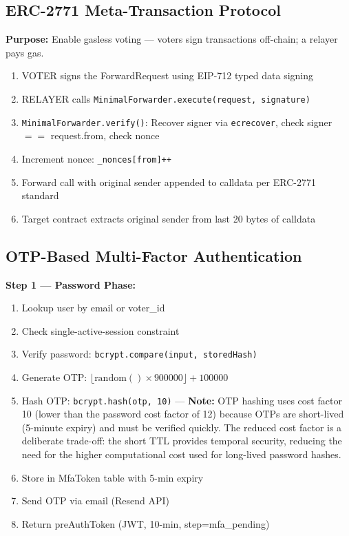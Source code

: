 \documentclass[oneside,a4paper,12pt]{book}
\begin{document}
\subsection{ERC-2771 Meta-Transaction Protocol}
\textbf{Purpose:} Enable gasless voting --- voters sign transactions off-chain; a relayer pays gas.
\begin{enumerate}[leftmargin=1.5cm]
    \item VOTER signs the ForwardRequest using EIP-712 typed data signing
    \item RELAYER calls \texttt{MinimalForwarder.execute(request, signature)}
    \item \texttt{MinimalForwarder.verify()}: Recover signer via \texttt{ecrecover}, check signer $==$ request.from, check nonce
    \item Increment nonce: \texttt{\_nonces[from]++}
    \item Forward call with original sender appended to calldata per ERC-2771 standard
    \item Target contract extracts original sender from last 20 bytes of calldata
\end{enumerate}

\subsection{OTP-Based Multi-Factor Authentication}

\textbf{Step 1 --- Password Phase:}
\begin{enumerate}[leftmargin=1.5cm]
    \item Lookup user by email or voter\_id
    \item Check single-active-session constraint
    \item Verify password: \texttt{bcrypt.compare(input, storedHash)}
    \item Generate OTP: $\lfloor \text{random}() \times 900000 \rfloor + 100000$
    \item Hash OTP: \texttt{bcrypt.hash(otp, 10)} --- \textbf{Note:} OTP hashing uses cost factor 10 (lower than the password cost factor of 12) because OTPs are short-lived (5-minute expiry) and must be verified quickly. The reduced cost factor is a deliberate trade-off: the short TTL provides temporal security, reducing the need for the higher computational cost used for long-lived password hashes.
    \item Store in MfaToken table with 5-min expiry
    \item Send OTP via email (Resend API)
    \item Return preAuthToken (JWT, 10-min, step=mfa\_pending)
\end{enumerate}
\end{document}
